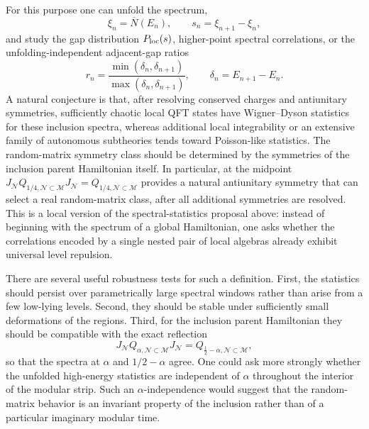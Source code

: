 \documentclass[a4paper,11pt]{article}
\theoremstyle{definition}
\newcommand{\mN}{\mathcal{N}}
\newcommand{\mM}{\mathcal{M}}
\begin{document}
For this purpose one can unfold the spectrum,
\begin{equation}
    \xi_n=\overline N(E_n),
    \qquad
    s_n=\xi_{n+1}-\xi_n,
    \label{eq:local-unfolded-gaps}
\end{equation}
and study the gap distribution $P_{\rm loc}(s)$, higher-point spectral correlations, or the unfolding-independent adjacent-gap ratios
\begin{equation}
    r_n
    =
    \frac{\min(\delta_n,\delta_{n+1})}
         {\max(\delta_n,\delta_{n+1})},
    \qquad
    \delta_n=E_{n+1}-E_n .
    \label{eq:local-gap-ratio}
\end{equation}
A natural conjecture is that, after resolving conserved charges and antiunitary symmetries, sufficiently chaotic local QFT states have Wigner--Dyson statistics for these inclusion spectra, whereas additional local integrability or an extensive family of autonomous subtheories tends toward Poisson-like statistics.  The random-matrix symmetry class should be determined by the symmetries of the inclusion parent Hamiltonian itself.  In particular, at the midpoint $J_{\mN}Q_{1/4,\mN\subset\mM}J_{\mN}=Q_{1/4,\mN\subset\mM}$ provides a natural antiunitary symmetry that can select a real random-matrix class, after all additional symmetries are resolved.  This is a local version of the spectral-statistics proposal above: instead of beginning with the spectrum of a global Hamiltonian, one asks whether the correlations encoded by a single nested pair of local algebras already exhibit universal level repulsion.

There are several useful robustness tests for such a definition.  First, the statistics should persist over parametrically large spectral windows rather than arise from a few low-lying levels.  Second, they should be stable under sufficiently small deformations of the regions.  Third, for the inclusion parent Hamiltonian they should be compatible with the exact reflection
\begin{equation}
    J_{\mN}Q_{\alpha,\mN\subset\mM}J_{\mN}
    =
    Q_{\frac12-\alpha,\mN\subset\mM},
\end{equation}
so that the spectra at $\alpha$ and $1/2-\alpha$ agree.  One could ask more strongly whether the unfolded high-energy statistics are independent of $\alpha$ throughout the interior of the modular strip.  Such an $\alpha$-independence would suggest that the random-matrix behavior is an invariant property of the inclusion rather than of a particular imaginary modular time.
\end{document}
